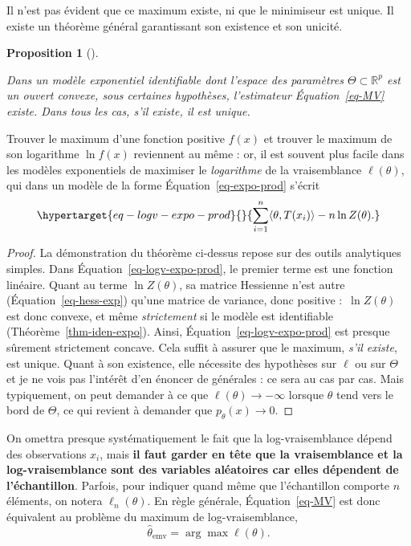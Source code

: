 \documentclass[
  10,
  letterpaper,
  DIV=11,
  numbers=noendperiod]{scrreport}
\newcommand{\emv}{\hat{\theta}_{\mathrm{emv}}}
\theoremstyle{plain}
\theoremstyle{definition}
\theoremstyle{plain}
\newtheorem{proposition}{Proposition}[chapter]
\theoremstyle{definition}
\theoremstyle{definition}
\theoremstyle{plain}
\theoremstyle{remark}
\begin{document}
Il n'est pas évident que ce maximum existe, ni que le minimiseur est
unique. Il existe un théorème général garantissant son existence et son
unicité.

\begin{proposition}[]\protect\hypertarget{prp-maxvraisex}{}\label{prp-maxvraisex}

Dans un modèle exponentiel identifiable dont l'espace des paramètres
\(\Theta \subset \mathbb{R}^p\) est un ouvert convexe, sous certaines
hypothèses, l'estimateur Équation~\ref{eq-MV} existe. Dans tous les cas,
s'il existe, il est unique.

\end{proposition}

Trouver le maximum d'une fonction positive \(f(x)\) et trouver le
maximum de son logarithme \(\ln f(x)\) reviennent au même : or, il est
souvent plus facile dans les modèles exponentiels de maximiser le
\emph{logarithme} de la vraisemblance \(\ell(\theta)\), qui dans un
modèle de la forme Équation~\ref{eq-expo-prod} s'écrit
\begin{equation}\protect\hypertarget{eq-logv-expo-prod}{}{\sum_{i=1}^n \langle \theta, T(x_i)\rangle - n\ln Z(\theta). }\label{eq-logv-expo-prod}\end{equation}

\begin{proof}

La démonstration du théorème ci-dessus repose sur des outils analytiques
simples. Dans Équation~\ref{eq-logv-expo-prod}, le premier terme est une
fonction linéaire. Quant au terme \(\ln Z(\theta)\), sa matrice
Hessienne n'est autre (Équation~\ref{eq-hess-exp}) qu'une matrice de
variance, donc positive :~\(\ln Z(\theta)\) est donc convexe, et même
\emph{strictement} si le modèle est identifiable
(Théorème~\ref{thm-iden-expo}). Ainsi, Équation~\ref{eq-logv-expo-prod}
est presque sûrement strictement concave. Cela suffit à assurer que le
maximum, \emph{s'il existe}, est unique. Quant à son existence, elle
nécessite des hypothèses sur \(\ell\) ou sur \(\Theta\) et je ne vois
pas l'intérêt d'en énoncer de générales : ce sera au cas par cas. Mais
typiquement, on peut demander à ce que \(\ell(\theta) \to -\infty\)
lorsque \(\theta\) tend vers le bord de \(\Theta\), ce qui revient à
demander que \(p_\theta(x)\to 0\).

\end{proof}

On omettra presque systématiquement le fait que la log-vraisemblance
dépend des observations \(x_i\), mais \textbf{il faut garder en tête que
la vraisemblance et la log-vraisemblance sont des variables aléatoires
car elles dépendent de l'échantillon}. Parfois, pour indiquer quand même
que l'échantillon comporte \(n\) éléments, on notera \(\ell_n(\theta)\).
En règle générale, Équation~\ref{eq-MV} est donc équivalent au problème
du maximum de log-vraisemblance, \[ \emv = \arg \max \ell(\theta).\]
\end{document}
